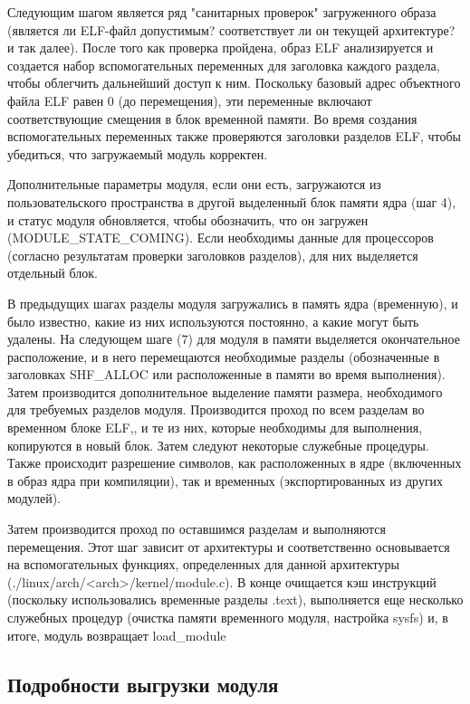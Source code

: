 Следующим шагом является ряд "санитарных проверок" загруженного образа (является ли ELF-файл допустимым? соответствует ли он текущей архитектуре? и так далее). После того как проверка пройдена, образ ELF анализируется и создается набор вспомогательных переменных для заголовка каждого раздела, чтобы облегчить дальнейший доступ к ним. Поскольку базовый адрес объектного файла ELF равен 0 (до перемещения), эти переменные включают соответствующие смещения в блок временной памяти. Во время создания вспомогательных переменных также проверяются заголовки разделов ELF, чтобы убедиться, что загружаемый модуль корректен.

Дополнительные параметры модуля, если они есть, загружаются из пользовательского пространства в другой выделенный блок памяти ядра (шаг 4), и статус модуля обновляется, чтобы обозначить, что он загружен (MODULE\_STATE\_COMING). Если необходимы данные для процессоров (согласно результатам проверки заголовков разделов), для них выделяется отдельный блок.

В предыдущих шагах разделы модуля загружались в память ядра (временную), и было известно, какие из них используются постоянно, а какие могут быть удалены. На следующем шаге (7) для модуля в памяти выделяется окончательное расположение, и в него перемещаются необходимые разделы (обозначенные в заголовках SHF\_ALLOC или расположенные в памяти во время выполнения). Затем производится дополнительное выделение памяти размера, необходимого для требуемых разделов модуля. Производится проход по всем разделам во временном блоке ELF,, и те из них, которые необходимы для выполнения, копируются в новый блок. Затем следуют некоторые служебные процедуры. Также происходит разрешение символов, как расположенных в ядре (включенных в образ ядра при компиляции), так и временных (экспортированных из других модулей).

Затем производится проход по оставшимся разделам и выполняются перемещения. Этот шаг зависит от архитектуры и соответственно основывается на вспомогательных функциях, определенных для данной архитектуры (./linux/arch/<arch>/kernel/module.c). В конце очищается кэш инструкций (поскольку использовались временные разделы .text), выполняется еще несколько служебных процедур (очистка памяти временного модуля, настройка sysfs) и, в итоге, модуль возвращает load\_module
\subsection{Подробности выгрузки модуля}


